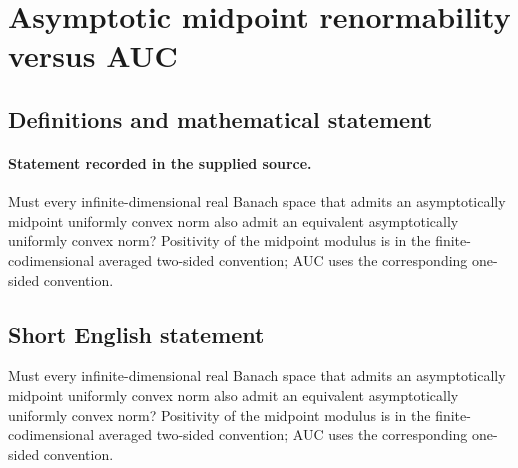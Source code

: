 \documentclass[11pt]{article}
\begin{document}
\section*{Asymptotic midpoint renormability versus AUC}\label{30007176}
\subsection{Definitions and mathematical statement}
\paragraph{Statement recorded in the supplied source.}
Must every infinite-dimensional real Banach space that admits an asymptotically midpoint uniformly convex norm also admit an equivalent asymptotically uniformly convex norm? Positivity of the midpoint modulus is in the finite-codimensional averaged two-sided convention; AUC uses the corresponding one-sided convention.
\subsection{Short English statement}
Must every infinite-dimensional real Banach space that admits an asymptotically midpoint uniformly convex norm also admit an equivalent asymptotically uniformly convex norm? Positivity of the midpoint modulus is in the finite-codimensional averaged two-sided convention; AUC uses the corresponding one-sided convention.
\end{document}
